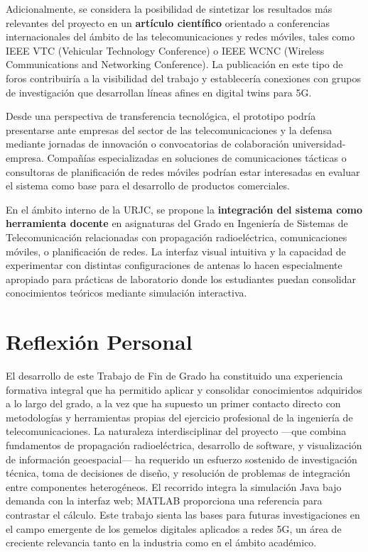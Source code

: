 Adicionalmente, se considera la posibilidad de sintetizar los resultados más relevantes del proyecto en un \textbf{artículo científico} orientado a conferencias internacionales del ámbito de las telecomunicaciones y redes móviles, tales como IEEE VTC (Vehicular Technology Conference) o IEEE WCNC (Wireless Communications and Networking Conference). La publicación en este tipo de foros contribuiría a la visibilidad del trabajo y establecería conexiones con grupos de investigación que desarrollan líneas afines en digital twins para 5G.

Desde una perspectiva de transferencia tecnológica, el prototipo podría presentarse ante empresas del sector de las telecomunicaciones y la defensa mediante jornadas de innovación o convocatorias de colaboración universidad-empresa. Compañías especializadas en soluciones de comunicaciones tácticas o consultoras de planificación de redes móviles podrían estar interesadas en evaluar el sistema como base para el desarrollo de productos comerciales.

En el ámbito interno de la URJC, se propone la \textbf{integración del sistema como herramienta docente} en asignaturas del Grado en Ingeniería de Sistemas de Telecomunicación relacionadas con propagación radioeléctrica, comunicaciones móviles, o planificación de redes. La interfaz visual intuitiva y la capacidad de experimentar con distintas configuraciones de antenas lo hacen especialmente apropiado para prácticas de laboratorio donde los estudiantes puedan consolidar conocimientos teóricos mediante simulación interactiva.

\section{Reflexión Personal}
\label{sec:reflexion}

El desarrollo de este Trabajo de Fin de Grado ha constituido una experiencia formativa integral que ha permitido aplicar y consolidar conocimientos adquiridos a lo largo del grado, a la vez que ha supuesto un primer contacto directo con metodologías y herramientas propias del ejercicio profesional de la ingeniería de telecomunicaciones. La naturaleza interdisciplinar del proyecto ---que combina fundamentos de propagación radioeléctrica, desarrollo de software, y visualización de información geoespacial--- ha requerido un esfuerzo sostenido de investigación técnica, toma de decisiones de diseño, y resolución de problemas de integración entre componentes heterogéneos. El recorrido integra la simulación Java bajo demanda con la interfaz web; MATLAB proporciona una referencia para contrastar el cálculo. Este trabajo sienta las bases para futuras investigaciones en el campo emergente de los gemelos digitales aplicados a redes 5G, un área de creciente relevancia tanto en la industria como en el ámbito académico.
